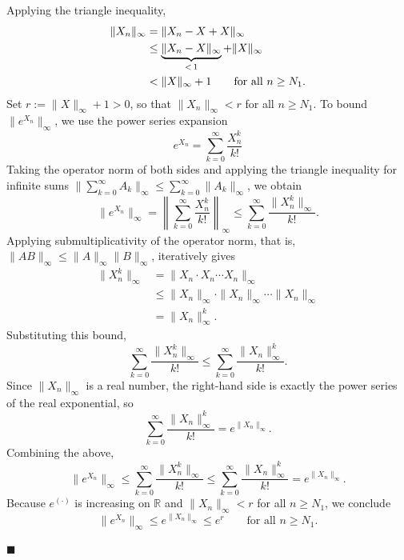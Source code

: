 \documentclass[a4paper, amsfonts, amssymb, amsmath, reprint, showkeys, nofootinbib, twoside, aps, pra]{revtex4-2}
\theoremstyle{definition}
\renewenvironment{proof}{\noindent{\bfseries Proof.}}{\hfill$\blacksquare$}
\begin{document}
\begin{proof}
Applying the triangle inequality,
\begin{align}
    \|X_n\|_{\infty} 
    &= \|X_n - X + X\|_{\infty} \notag\\ 
    &\le \underbrace{\|X_n - X\|_{\infty}}_{<\, 1} + \|X\|_{\infty} \notag\\
    &< \|X\|_{\infty} + 1
    \qquad \text{for all } n\ge N_1.
\end{align}
Set $r := \|X\|_{\infty}+1 > 0$, so that $\|X_n\|_{\infty} < r$ for all $n \ge N_1$.
To bound $\|e^{X_n}\|_\infty$, we use the power series expansion
\begin{equation}
    e^{X_n} = \sum_{k=0}^{\infty} \frac{X_n^k}{k!} 
\end{equation}
Taking the operator norm of both sides and applying the triangle inequality for 
infinite sums $\bigl\|\sum_{k=0}^{\infty} A_k\bigr\|_\infty \le \sum_{k=0}^{\infty} 
\|A_k\|_\infty$, we obtain
\begin{equation}
    \|e^{X_n}\|_{\infty} 
    = \left\|\sum_{k=0}^{\infty} \frac{X_n^k}{k!}\right\|_\infty
    \le \sum_{k=0}^{\infty} \frac{\|X_n^k\|_{\infty}}{k!}.
\end{equation}
Applying submultiplicativity of the operator norm, that is, 
$\|AB\|_\infty \le \|A\|_\infty\|B\|_\infty$, iteratively gives
\begin{equation}
\begin{aligned}
    \|X_n^k\|_\infty 
    &= \|X_n \cdot X_n \cdots X_n\|_\infty \\
    &\le \|X_n\|_\infty \cdot \|X_n\|_\infty \cdots \|X_n\|_\infty \\
    &= \|X_n\|_\infty^k.
\end{aligned}
\end{equation}
Substituting this bound,
\begin{equation}
    \sum_{k=0}^{\infty} \frac{\|X_n^k\|_{\infty}}{k!} 
    \le \sum_{k=0}^{\infty} \frac{\|X_n\|_{\infty}^k}{k!}.
\end{equation}
Since $\|X_n\|_\infty$ is a real number, the right-hand side is exactly the 
power series of the real exponential, so
\begin{equation}
    \sum_{k=0}^{\infty} \frac{\|X_n\|_{\infty}^k}{k!} = e^{\|X_n\|_{\infty}}.
\end{equation}
Combining the above,
\begin{equation}
    \|e^{X_n}\|_{\infty} \le \sum_{k=0}^{\infty} \frac{\|X_n^k\|_\infty}{k!}
    \le \sum_{k=0}^{\infty} \frac{\|X_n\|_{\infty}^k}{k!} 
    = e^{\|X_n\|_{\infty}}.
\end{equation}
Because $e^{(\cdot)}$ is increasing on $\mathbb{R}$ and $\|X_n\|_\infty < r$ 
for all $n \ge N_1$, we conclude
\begin{equation}
    \|e^{X_n}\|_{\infty} \le e^{\|X_n\|_{\infty}} \le e^{r}
    \qquad \text{for all } n\ge N_1.
\end{equation}


\end{proof}
\end{document}
